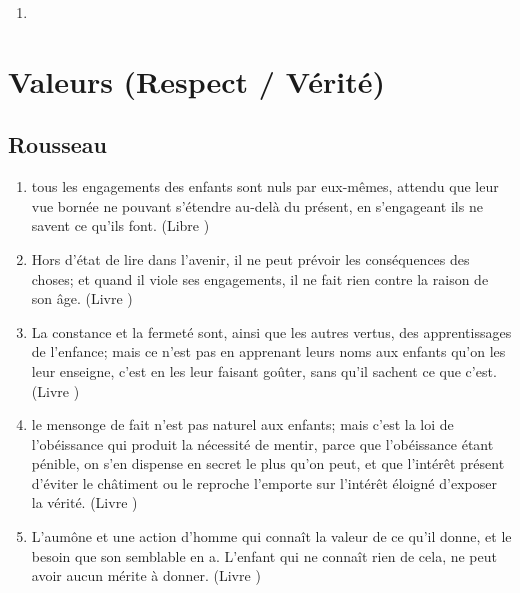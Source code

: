 \documentclass[a4paper, 11pt, hidelinks]{article}
\newcommand{\rb}[1]{\Romanbar{#1}}
\begin{document}
\begin{enumerate}
    \item 
\end{enumerate}



























\section{Valeurs (Respect / Vérité)}



\subsection{Rousseau}


\begin{enumerate}
    \item tous les engagements des enfants sont nuls par eux-mêmes, attendu que leur vue bornée ne pouvant s'étendre au-delà du présent, en s'engageant ils ne savent ce qu'ils font. (Libre \rb{2})
    \item Hors d'état de lire dans l'avenir, il ne peut prévoir les conséquences des choses; et quand il viole ses engagements, il ne fait rien contre la raison de son âge. (Livre \rb{2})
    \item La constance et la fermeté sont, ainsi que les autres vertus, des apprentissages de l'enfance; mais ce n'est pas en apprenant leurs noms aux enfants qu'on les leur enseigne, c'est en les leur faisant goûter, sans qu'il sachent ce que c'est. (Livre \rb{2})
    \item le mensonge de fait n'est pas naturel aux enfants; mais c'est la loi de l'obéissance qui produit la nécessité de mentir, parce que l'obéissance étant pénible, on s'en dispense en secret le plus qu'on peut, et que l'intérêt présent d'éviter le châtiment ou le reproche l'emporte sur l'intérêt éloigné d'exposer la vérité. (Livre \rb{2}) 
    \item L'aumône et une action d'homme qui connaît la valeur de ce qu'il donne, et le besoin que son semblable en a. L'enfant qui ne connaît rien de cela, ne peut avoir aucun mérite à donner. (Livre \rb{2})
\end{enumerate}
\end{document}
